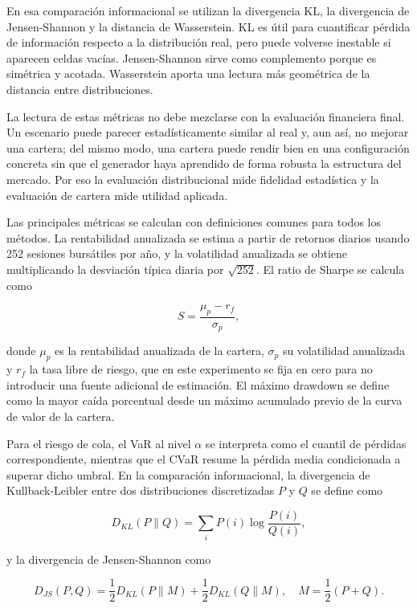 \documentclass[11pt,a4paper,spanish,oneside]{book}
\numberwithin{equation}{chapter}
\numberwithin{figure}{chapter}
\begin{document}
En esa comparación informacional se utilizan la divergencia KL, la divergencia de Jensen-Shannon y la distancia de Wasserstein. KL es útil para cuantificar pérdida de información respecto a la distribución real, pero puede volverse inestable si aparecen celdas vacías. Jensen-Shannon sirve como complemento porque es simétrica y acotada. Wasserstein aporta una lectura más geométrica de la distancia entre distribuciones.

La lectura de estas métricas no debe mezclarse con la evaluación financiera final. Un escenario puede parecer estadísticamente similar al real y, aun así, no mejorar una cartera; del mismo modo, una cartera puede rendir bien en una configuración concreta sin que el generador haya aprendido de forma robusta la estructura del mercado. Por eso la evaluación distribucional mide fidelidad estadística y la evaluación de cartera mide utilidad aplicada.

Las principales métricas se calculan con definiciones comunes para todos los métodos. La rentabilidad anualizada se estima a partir de retornos diarios usando 252 sesiones bursátiles por año, y la volatilidad anualizada se obtiene multiplicando la desviación típica diaria por $\sqrt{252}$. El ratio de Sharpe se calcula como

\begin{equation}
S = \frac{\mu_p - r_f}{\sigma_p},
\end{equation}

donde $\mu_p$ es la rentabilidad anualizada de la cartera, $\sigma_p$ su volatilidad anualizada y $r_f$ la tasa libre de riesgo, que en este experimento se fija en cero para no introducir una fuente adicional de estimación. El máximo drawdown se define como la mayor caída porcentual desde un máximo acumulado previo de la curva de valor de la cartera.

Para el riesgo de cola, el VaR al nivel $\alpha$ se interpreta como el cuantil de pérdidas correspondiente, mientras que el CVaR resume la pérdida media condicionada a superar dicho umbral. En la comparación informacional, la divergencia de Kullback-Leibler entre dos distribuciones discretizadas $P$ y $Q$ se define como

\begin{equation}
D_{KL}(P\|Q)=\sum_i P(i)\log\frac{P(i)}{Q(i)},
\end{equation}

y la divergencia de Jensen-Shannon como

\begin{equation}
D_{JS}(P,Q)=\frac{1}{2}D_{KL}(P\|M)+\frac{1}{2}D_{KL}(Q\|M),\quad M=\frac{1}{2}(P+Q).
\end{equation}
\end{document}

